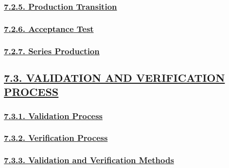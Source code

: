 \documentclass[
]{article}
\begin{document}
\hypertarget{production-transition}{%
\subsubsection{\texorpdfstring{\protect\hyperlink{production-transition-1}{7.2.5.
Production
Transition}}{7.2.5. Production Transition}}\label{production-transition}}

\hypertarget{acceptance-test}{%
\subsubsection{\texorpdfstring{\protect\hyperlink{acceptance-test-1}{7.2.6.
Acceptance Test}}{7.2.6. Acceptance Test}}\label{acceptance-test}}

\hypertarget{series-production}{%
\subsubsection{\texorpdfstring{\protect\hyperlink{series-production-1}{7.2.7.
Series Production}}{7.2.7. Series Production}}\label{series-production}}

\hypertarget{validation-and-verification-process}{%
\subsection{\texorpdfstring{\protect\hyperlink{validation-and-verification-process-1}{7.3.
VALIDATION AND VERIFICATION
PROCESS}}{7.3. VALIDATION AND VERIFICATION PROCESS}}\label{validation-and-verification-process}}

\hypertarget{validation-process}{%
\subsubsection{\texorpdfstring{\protect\hyperlink{validation-process-1}{7.3.1.
Validation
Process}}{7.3.1. Validation Process}}\label{validation-process}}

\hypertarget{verification-process}{%
\subsubsection{\texorpdfstring{\protect\hyperlink{verification-process-1}{7.3.2.
Verification
Process}}{7.3.2. Verification Process}}\label{verification-process}}

\hypertarget{validation-and-verification-methods}{%
\subsubsection{\texorpdfstring{\protect\hyperlink{validation-and-verification-methods-1}{7.3.3.
Validation and Verification
Methods}}{7.3.3. Validation and Verification Methods}}\label{validation-and-verification-methods}}
\end{document}
